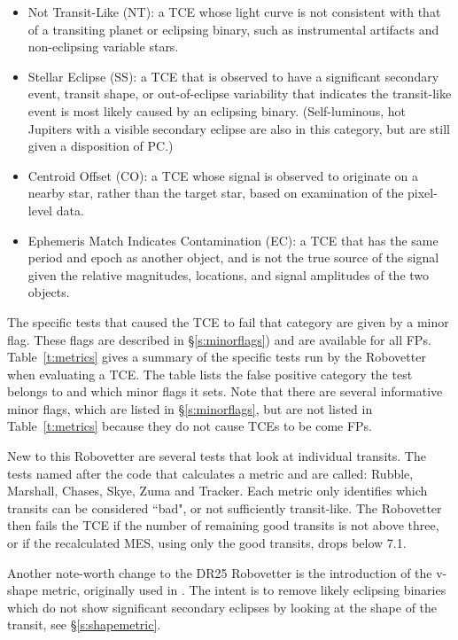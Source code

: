 \begin{itemize}
  \item Not Transit-Like (NT): a TCE whose light curve is not consistent with that of a transiting planet or eclipsing binary, such as instrumental artifacts and non-eclipsing variable stars.
  \item  Stellar Eclipse (SS): a TCE that is observed to have a significant secondary event, transit shape, or out-of-eclipse variability that indicates the transit-like event is most likely caused by an eclipsing binary. (Self-luminous, hot Jupiters with a visible secondary eclipse are also in this category, but are still given a disposition of PC.)
  \item Centroid Offset (CO): a TCE whose signal is observed to originate on a nearby star, rather than the target star, based on examination of the pixel-level data.
  \item Ephemeris Match Indicates Contamination (EC): a TCE that has the same period and epoch as another object, and is not the true source of the signal given the relative magnitudes, locations, and signal amplitudes of the two objects.
\end{itemize}

The specific tests that caused the TCE to fail that category are given by a minor flag. These flags are described in \S\ref{s:minorflags}) and are available for all FPs.  Table~\ref{t:metrics} gives a summary of the specific tests run by the Robovetter when evaluating a TCE.  The table lists the false positive category the test belongs to and which minor flags it sets.  Note that there are several informative minor flags, which are listed in \S\ref{s:minorflags}, but are not listed in Table~\ref{t:metrics} because they do not cause TCEs to be come FPs.

New to this Robovetter are several tests that look at individual transits. The tests named after the code that calculates a metric and are called: Rubble, Marshall, Chases, Skye, Zuma and Tracker.  Each metric only identifies which transits can be considered ``bad", or not sufficiently transit-like.  The Robovetter then fails the TCE if the number of remaining good transits is not above three, or if the recalculated MES, using only the good transits, drops below 7.1.

Another note-worth change to the DR25 Robovetter is the introduction of the v-shape metric, originally used in \citet{Batalha2013}.  The intent is to remove likely eclipsing binaries which do not show significant secondary eclipses by looking at the shape of the transit, see \S\ref{s:shapemetric}.

